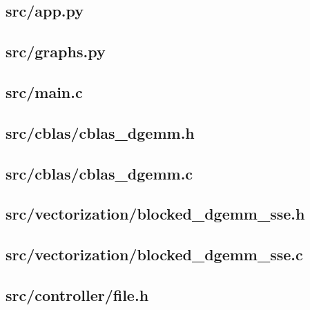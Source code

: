 \subsection{src/app.py}
	
	\newpage

\subsection{src/graphs.py}
	
	\newpage

\subsection{src/main.c}
	
	\newpage

\subsection{src/cblas/cblas\_dgemm.h}
	
	\newpage

\subsection{src/cblas/cblas\_dgemm.c}
	
	\newpage

\subsection{src/vectorization/blocked\_dgemm\_sse.h}
	
	\newpage

\subsection{src/vectorization/blocked\_dgemm\_sse.c}
	
	\newpage

\subsection{src/controller/file.h}
	
	\newpage

